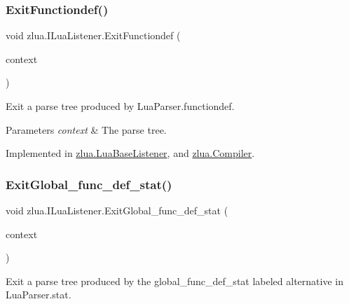 \subsubsection{\texorpdfstring{Exit\+Functiondef()}{ExitFunctiondef()}}
{\footnotesize\ttfamily void zlua.\+I\+Lua\+Listener.\+Exit\+Functiondef (\begin{DoxyParamCaption}\item[{\mbox{[}\+Not\+Null\mbox{]} \mbox{\hyperlink{classzlua_1_1_lua_parser_1_1_functiondef_context}{Lua\+Parser.\+Functiondef\+Context}}}]{context }\end{DoxyParamCaption})}



Exit a parse tree produced by Lua\+Parser.\+functiondef. 


\begin{DoxyParams}{Parameters}
{\em context} & The parse tree.\\
\hline
\end{DoxyParams}


Implemented in \mbox{\hyperlink{classzlua_1_1_lua_base_listener_adb6913ed219a112505cb4ba783485c2e}{zlua.\+Lua\+Base\+Listener}}, and \mbox{\hyperlink{classzlua_1_1_compiler_ac116526982cb40d063ff68949ab001e0}{zlua.\+Compiler}}.

\mbox{\label{interfacezlua_1_1_i_lua_listener_a13e62813408bab9b10861e768a3c5ca1}} 
\subsubsection{\texorpdfstring{Exit\+Global\+\_\+func\+\_\+def\+\_\+stat()}{ExitGlobal\_func\_def\_stat()}}
{\footnotesize\ttfamily void zlua.\+I\+Lua\+Listener.\+Exit\+Global\+\_\+func\+\_\+def\+\_\+stat (\begin{DoxyParamCaption}\item[{\mbox{[}\+Not\+Null\mbox{]} \mbox{\hyperlink{classzlua_1_1_lua_parser_1_1_global__func__def__stat_context}{Lua\+Parser.\+Global\+\_\+func\+\_\+def\+\_\+stat\+Context}}}]{context }\end{DoxyParamCaption})}



Exit a parse tree produced by the {\ttfamily global\+\_\+func\+\_\+def\+\_\+stat} labeled alternative in Lua\+Parser.\+stat. 


